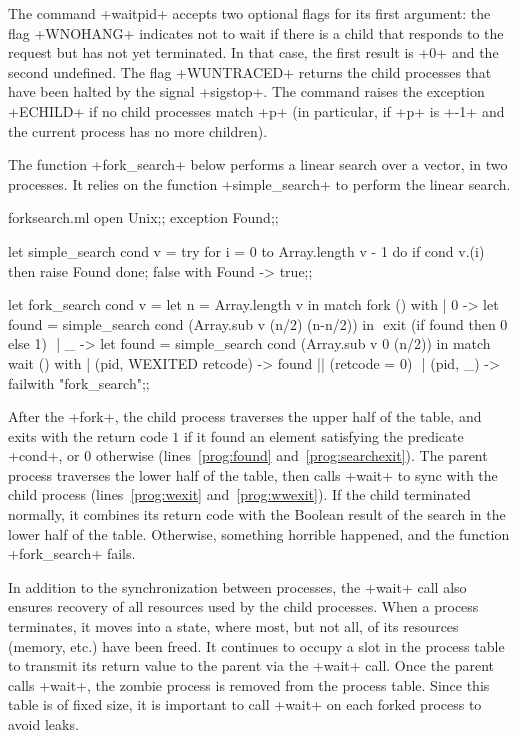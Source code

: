 The command \ml+waitpid+ accepts two optional flags for its first
argument: the flag \ml+WNOHANG+ indicates not to wait if there is
a child that responds to the request but has not yet terminated.
In that case, the first result is \ml+0+ and the second undefined.
The flag \ml+WUNTRACED+ returns the child processes that have been
halted by the signal \ml+sigstop+.  The command raises the exception
\ml+ECHILD+ if no child processes match \ml+p+ (in particular, if
\ml+p+ is \ml+-1+ and the current process has no more children).

\begin{example}
\label{ex/forksearch}
The function \ml+fork_search+ below performs a linear search over
a vector, in two processes. It relies on the function \ml+simple_search+
to perform the linear search.
%
\begin{listingcodefile}[style=numbers]{forksearch.ml}
open Unix;;
exception Found;;

let simple_search cond v =
 try
   for i = 0 to Array.length v - 1 do
     if cond v.(i) then raise Found
   done;
   false
 with Found -> true;;

let fork_search cond v =
 let n = Array.length v in
 match fork () with
 | 0 ->
     let found = simple_search cond (Array.sub v (n/2) (n-n/2)) in
$\label{prog:found}$
     exit (if found then 0 else 1) $\label{prog:searchexit}$
 | _ ->
     let found = simple_search cond (Array.sub v 0 (n/2)) in
     match wait () with
     | (pid, WEXITED retcode) -> found || (retcode = 0) $\label{prog:wexit}$
     | (pid, _)               -> failwith "fork_search";;$\label{prog:wwexit}$
\end{listingcodefile}
%
After the \ml+fork+, the child process traverses the upper half of
the table, and exits with the return code $1$ if it found an element
satisfying the predicate \ml+cond+, or $0$ otherwise
(lines~\ref{prog:found} and~\ref{prog:searchexit}). The parent process
traverses the lower half of the table, then calls \ml+wait+ to
sync with the child process (lines~\ref{prog:wexit}
and~\ref{prog:wwexit}). If the child terminated normally, it combines
its return code with the Boolean result of the search in the lower
half of the table. Otherwise, something horrible happened, and the
function \ml+fork_search+ fails.
\end{example}

In addition to the synchronization between processes, the \ml+wait+
call also ensures recovery of all resources used by the child
processes.  When a process terminates, it moves into a 
state, where most, but not all, of its resources (memory, etc.) have
been freed. It continues to occupy a slot in the process table to
transmit its return value to the parent via the \ml+wait+ call.
Once the parent calls \ml+wait+, the zombie process is removed from
the process table. Since this table is of fixed size, it is important
to call \ml+wait+ on each forked process to avoid leaks.

